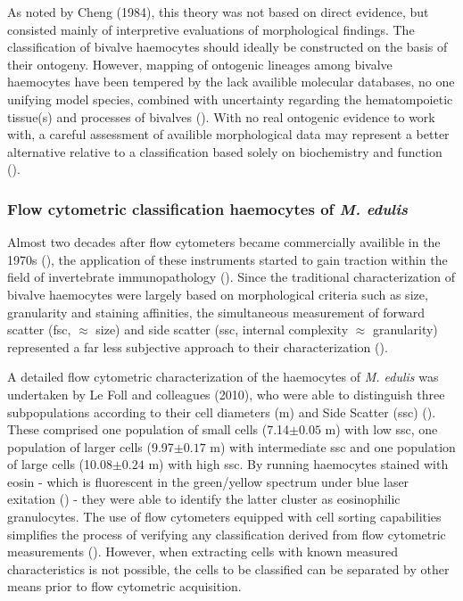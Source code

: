 As noted by Cheng (1984), this theory was not based on direct evidence, but consisted mainly of interpretive evaluations of morphological findings. The classification of bivalve haemocytes should ideally be constructed on the basis of their ontogeny. However, mapping of ontogenic lineages among bivalve haemocytes have been tempered by the lack availible molecular databases, no one unifying model species, combined with uncertainty regarding the hematompoietic tissue(s) and processes of bivalves (\cite{Hine1999, Smith2016, Pila2016, delaBallina2022}). With no real ontogenic evidence to work with, a careful assessment of availible morphological data may represent a better alternative relative to a classification based solely on biochemistry and function (\cite{Hine1999}). 

\subsubsection{Flow cytometric classification haemocytes of \emph{M. edulis}}
Almost two decades after flow cytometers became commercially availible in the 1970s (\cite{Shapiro2004}), the application of these instruments started to gain traction within the field of invertebrate immunopathology (\cite{Fisher1988}). Since the traditional characterization of bivalve haemocytes were largely based on morphological criteria such as size, granularity and staining affinities, the simultaneous measurement of forward scatter (\acrshort{fsc}, $\approx$ size) and side scatter (\acrshort{ssc}, internal complexity $\approx$ granularity) represented a far less subjective approach to their characterization (\cite{AshtonAlcox1998, Allam2002, Mateo2009}).

A detailed flow cytometric characterization of the haemocytes of \emph{M. edulis} was undertaken by Le Foll and colleagues (2010), who were able to distinguish three subpopulations according to their cell diameters (\micro m) and Side Scatter (\acrshort{ssc}) (\cite{LeFoll2010}). These comprised one population of small cells (7.14$\pm{0.05}$ \micro m) with low \acrshort{ssc}, one population of larger cells (9.97$\pm{0.17}$ \micro m) with intermediate \acrshort{ssc} and one population of large cells (10.08$\pm{0.24}$ \micro m) with high \acrshort{ssc}. By running haemocytes stained with eosin - which is fluorescent in the green/yellow spectrum under blue laser exitation (\cite{Elfer2016, Koegle2020}) - they were able to identify the latter cluster as eosinophilic granulocytes. The use of flow cytometers equipped with cell sorting capabilities simplifies the process of verifying any classification derived from flow cytometric measurements (\cite{Shapiro2004}). However, when extracting cells with known measured characteristics is not possible, the cells to be classified can be separated by other means prior to flow cytometric acquisition.

